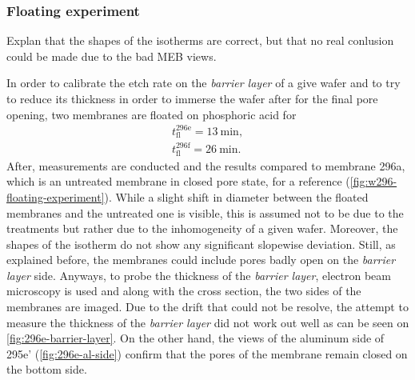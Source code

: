 \documentclass[../thesis.tex]{subfiles}
\begin{document}
            \subsubsection{Floating experiment}
            \label{subsec:floating-experiment}

              Explan that the shapes of the isotherms are correct, but that no real conlusion could be made due to the bad MEB views.

              

              In order to calibrate the etch rate on the \textit{barrier layer} of a give wafer and to try to reduce its thickness in order to immerse the wafer after for the final pore opening, two membranes are floated on phosphoric acid for
              \begin{equation}
                  \begin{split}
                      t^\mathrm{296e}_\mathrm{fl}=\SI{13}{\minute}, \\
                      t^\mathrm{296f}_\mathrm{fl}=\SI{26}{\minute}.
                  \end{split}
                  \label{eq:floating-times}
              \end{equation}
              After, measurements are conducted and the results compared to membrane 296a, which is an untreated membrane in closed pore state, for a reference (\cref{fig:w296-floating-experiment}). While a slight shift in diameter between the floated membranes and the untreated one is visible, this is assumed not to be due to the treatments but rather due to the inhomogeneity of a given wafer. Moreover, the shapes of the isotherm do not show any significant slopewise deviation. Still, as explained before, the membranes could include pores badly open on the \textit{barrier layer} side. Anyways, to probe the thickness of the \textit{barrier layer}, electron beam microscopy is used and along with the cross section, the two sides of the membranes are imaged. Due to the drift that could not be resolve, the attempt to measure the thickness of the \textit{barrier layer} did not work out well as can be seen on \cref{fig:296e-barrier-layer}. On the other hand, the views of the aluminum side of 295e' (\cref{fig:296e-al-side}) confirm that the pores of the membrane remain closed on the bottom side.
\end{document}
